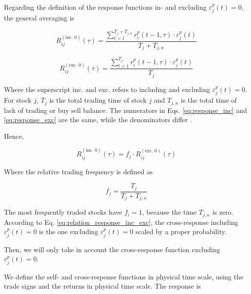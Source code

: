 Regarding the definition of the response functions in- and excluding
$\varepsilon^{p}_j \left( t\right) = 0$, the general averaging is

\begin{equation}\label{eq:response_inc}
    R_{ij}^{\left(\text{inc. }0\right)}\left(\tau\right)=
    \frac{\sum_{t=1}^{T_{j}+T_{j,n}} r^{p}_{i}\left(t - 1,\tau\right)
    \cdot\varepsilon_{j}^{p}\left(t \right)}{T_{j}+T_{j,n}}
\end{equation}

\begin{equation}\label{eq:response_exc}
    R_{ij}^{\left(\text{exc. }0\right)}\left(\tau\right)=
    \frac{\sum_{t=1}^{T_{j}} r^{p}_{i}\left(t - 1,\tau\right)
    \cdot\varepsilon_{j}^{p} \left(t\right)}{T_{j}}
\end{equation}

Where the superscript inc. and exc. refers to including and excluding
$\varepsilon^{p}_j \left( t\right) = 0$. For stock $j$, $T_j$  is the total
trading time of stock $j$ and $T_{j,n}$ is the total time of lack of trading or
buy sell balance. The numerators in Eqs. \ref{eq:response_inc} and
\ref{eq:response_exc} are the same, while the denominators differ
\cite{Wang_2016_avg}.

Hence,

\begin{equation}\label{eq:relation_response_inc_exc}
    R_{ij}^{\left(\text{inc. }0\right)}\left(\tau\right)=f_{j}
    \cdot R_{ij}^{\left(\text{exc. }0\right)}\left(\tau\right)
\end{equation}

Where the relative trading frequency is defined as \cite{Wang_2016_avg}

\begin{equation}\label{eq:response_trading_frequency}
    f_{j}=\frac{T_{j}}{T_{j}+T_{j,n}}
\end{equation}

The most frequently traded stocks have $f_{i} = 1$, because the time $T_{j,n}$
is zero. According to Eq. \ref{eq:relation_response_inc_exc}, the
cross-response including $\varepsilon^{p}_j \left( t\right) = 0$ is the one
excluding $\varepsilon^{p}_j \left( t\right) = 0$ scaled by a proper
probability.

Then, we will only take in account the cross-response function excluding
$\varepsilon^{p}_j \left( t\right) = 0$.

We define the self- and cross-response functions in physical time scale, using
the trade signs and the returns in physical time scale. The response is

